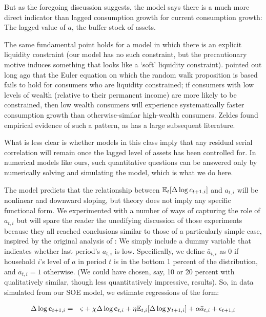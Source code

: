 \documentclass[titlepage]{./econtex}
\begin{document}
But as the foregoing discussion suggests, the model says there is a much more direct indicator than lagged consumption growth for current consumption growth:  The lagged value of $a$, the buffer stock of assets.

The same fundamental point holds for a model in which there is an explicit liquidity constraint (our model has no such constraint, but the precautionary motive induces something that looks like a `soft' liquidity constraint).  \cite{zeldes:jpe} pointed out long ago that the Euler equation on which the random walk proposition is based fails to hold for consumers who are liquidity constrained; if consumers with low levels of wealth (relative to their permanent income) are more likely to be constrained, then low wealth consumers will experience systematically faster consumption growth than otherwise-similar high-wealth consumers.  Zeldes found empirical evidence of such a pattern, as has a large subsequent literature.

What is less clear is whether models in this class imply that any residual serial correlation will remain once the lagged level of assets has been controlled for.  In numerical models like ours, such quantitative questions can be answered only by numerically solving and simulating the model, which is what we do here.

The model predicts that the relationship between $\operatorname{\mathbb{E}}_{t}[\Delta \log c_{t+1,i}]$ and $a_{t,i}$ will be nonlinear and downward sloping, but theory does not imply any specific functional form.  We experimented with a number of ways of capturing the role of $a_{t,i}$ but will spare the reader the unedifying discussion of those experiments because they all reached conclusions similar to those of a particularly simple case, inspired by the original analysis of \cite{zeldes:jpe}: We simply include a dummy variable that indicates whether last period's $a_{t,i}$ is low.  Specifically, we define $\bar{a}_{t,i}$ as 0 if household $i$'s level of ${a}$ in period $t$ is in the bottom 1 percent of the distribution, and $\bar{a}_{t,i}=1$ otherwise.  (We could have chosen, say, 10 or 20 percent with qualitatively similar, though less quantitatively impressive, results). So, in data simulated from our SOE model, we estimate regressions of the form: 

 \begin{eqnarray*}
\Delta \log       \mathbf{c} _{t+1,i}  &=&  \varsigma + \chi \Delta \log      \mathbf{c} _{t,i} + \eta     {\operatorname{\mathbb{E}}}_{t,i}[\Delta \log       \mathbf{y} _{t+1,i}]+ {\alpha} \bar{a}_{t,i}+\epsilon_{t+1,i}
\end{eqnarray*}
\end{document}
